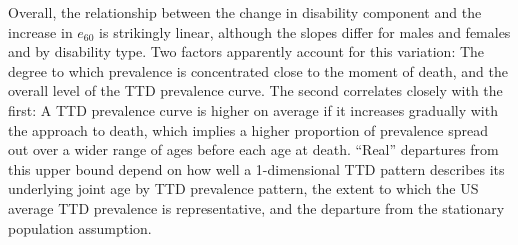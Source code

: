 \documentclass[12pt,oneside,a4paper]{article} %
\begin{document}
Overall, the relationship between the change in disability component and the
increase in $e_{60}$ is strikingly linear, although the slopes differ for males
and females and by disability type. %
Two factors apparently account for this variation: The degree to which prevalence is concentrated close to the moment of death, and the overall level of the TTD prevalence curve. The second correlates closely with the first: A TTD prevalence curve is higher on average if it increases gradually with the approach to death, which implies a higher proportion of prevalence spread out over a wider range of ages before each age at death. ``Real'' departures from this upper bound depend on
how well a 1-dimensional TTD pattern describes its underlying joint age by TTD prevalence pattern, the extent to which the US average TTD prevalence is representative, and the departure from the stationary population assumption.
\end{document}
